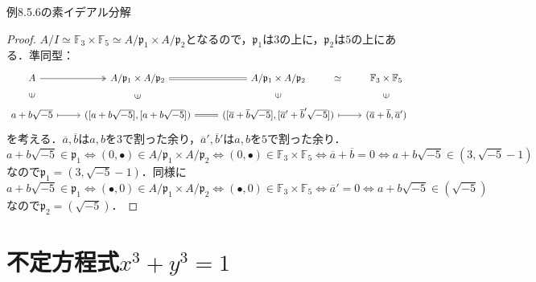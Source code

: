 \begin{screen}
  例8.5.6の素イデアル分解
\end{screen}
\begin{proof}
  $A/I \simeq \mathbb{F}_3 \times \mathbb{F}_5 \simeq A/\mathfrak{p}_1 \times A/\mathfrak{p}_2$となるので，$ \mathfrak{p}_1$は$3$の上に，$ \mathfrak{p}_2$は$5$の上にある．準同型：
  \[
  \begin{tikzcd}
    A \arrow[r, two heads] \arrow[d, phantom, " \ni" sloped] & A/\mathfrak{p}_1 \times A/\mathfrak{p}_2 \arrow[r, equal] \arrow[d, phantom, "\ni" sloped] & A/\mathfrak{p}_1 \times A/\mathfrak{p}_2 \arrow[r, phantom, "\simeq"] \arrow[d, phantom, "\ni" sloped] & \mathbb{F}_3 \times \mathbb{F}_5 \arrow[d, phantom, "\ni" sloped] \\
    a+b \sqrt{-5} \arrow[r, mapsto] & ([a+b \sqrt{-5}], [a+b \sqrt{-5}]) \arrow[r, equal] & ([ \overline{a}+ \overline{b} \sqrt{-5}], [ \overline{a}'+ \overline{b}' \sqrt{-5}]) \arrow[r, mapsto] & ( \overline{a}+ \overline{b}, \overline{a}')
  \end{tikzcd}
  \]
  を考える．$ \overline{a}, \overline{b}$は$a, b$を$3$で割った余り，$ \overline{a}', \overline{b}'$は$a, b$を$5$で割った余り．
  \[a+b \sqrt{-5} \in \mathfrak{p}_1 \Leftrightarrow(0, \bullet) \in A/\mathfrak{p}_1 \times A/\mathfrak{p}_2 \Leftrightarrow(0, \bullet) \in \mathbb{F}_3 \times \mathbb{F}_5 \Leftrightarrow \overline{a}+ \overline{b} = 0 \Leftrightarrow a+b \sqrt{-5} \in(3, \sqrt{-5}-1) \]
  なので$ \mathfrak{p}_1 = (3, \sqrt{-5}-1)$．同様に
  \[a+b \sqrt{-5} \in \mathfrak{p}_1 \Leftrightarrow( \bullet, 0) \in A/\mathfrak{p}_1 \times A/\mathfrak{p}_2 \Leftrightarrow( \bullet, 0) \in \mathbb{F}_3 \times \mathbb{F}_5 \Leftrightarrow \overline{a}' = 0 \Leftrightarrow a+b \sqrt{-5} \in( \sqrt{-5}) \]
  なので$ \mathfrak{p}_2 = ( \sqrt{-5})$．
\end{proof}

\setcounter{section}{6}
\section{不定方程式$x^3 + y^3 = 1$}
